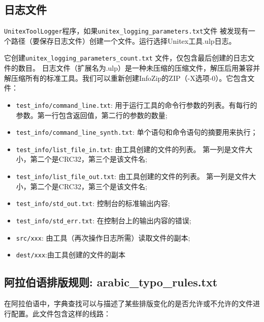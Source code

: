\subsection{日志文件}
 \label{section-log-file}
\verb+UnitexToolLogger+程序，如果\verb+unitex_logging_parameters.txt+文件 被发现有一个路径（要保存日志文件）创建一个文件。运行选择Unitex工具.ulp日志。

\bigskip
它创建\verb+unitex_logging_parameters_count.txt+ 文件，仅包含最后创建的日志文件的数目。
日志文件（扩展名为.ulp）是一种未压缩的压缩文件，解压后用兼容并解压缩所有的标准工具。我们可以重新创建InfoZip的ZIP（-X选项-0）。它包含文件：


\begin{itemize}
\item \verb+test_info/command_line.txt+:
用于运行工具的命令行参数的列表。有每行的参数。第一行包含返回值，第二行的参数的数量;

  \item \verb+test_info/command_line_synth.txt+:
单个语句和命令语句的摘要用来执行；


\item \verb+test_info/list_file_in.txt+: 
由工具创建的文件的列表。
第一列是文件大小，第二个是CRC32，第三个是该文件名;

\item \verb+test_info/list_file_out.txt+: 
由工具创建的文件的列表。
第一列是文件大小，第二个是CRC32，第三个是该文件名;

  \item \verb+test_info/std_out.txt+: 控制台的标准输出内容;

  \item \verb+test_info/std_err.txt+: 在控制台上的输出内容的错误;

  \item \verb+src/xxx+: 
  由工具（再次操作日志所需）读取文件的副本;

  \item \verb+dest/xxx+:由工具创建的文件的副本
\end{itemize}

\subsection{阿拉伯语排版规则: arabic\_typo\_rules.txt}
\label{subsection-arabic-typo-rules}
在阿拉伯语中，字典查找可以与描述了某些排版变化的是否允许或不允许的文件进行配置。此文件包含这样的线路：

